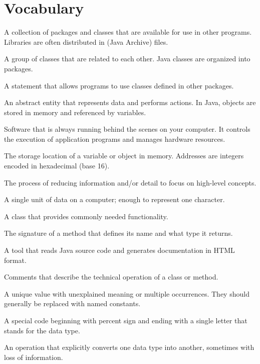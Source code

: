 \section{Vocabulary}

\begin{description}

A collection of packages and classes that are available for use in other programs.
Libraries are often distributed in  (Java Archive) files.

A group of classes that are related to each other.
Java classes are organized into packages.

A statement that allows programs to use classes defined in other packages.

An abstract entity that represents data and performs actions.
In Java, objects are stored in memory and referenced by variables.

Software that is always running behind the scenes on your computer.
It controls the execution of application programs and manages hardware resources.

The storage location of a variable or object in memory.
Addresses are integers encoded in hexadecimal (base 16).

The process of reducing information and/or detail to focus on high-level concepts.

A single unit of data on a computer; enough to represent one character.

A class that provides commonly needed functionality.

The signature of a method that defines its name and what type it returns.

A tool that reads Java source code and generates documentation in HTML format.

Comments that describe the technical operation of a class or method.

A unique value with unexplained meaning or multiple occurrences.
They should generally be replaced with named constants.

A special code beginning with percent sign and ending with a single letter that stands for the data type.

An operation that explicitly converts one data type into another, sometimes with loss of information.


\end{description}
